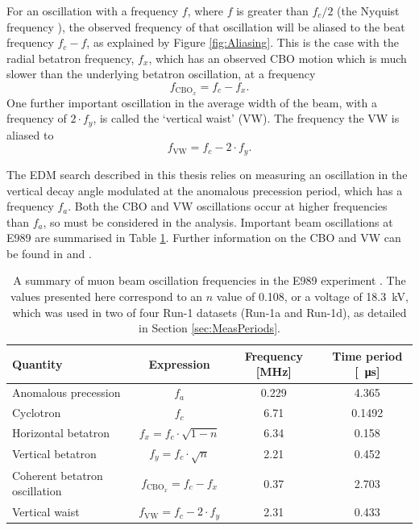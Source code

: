 For an oscillation with a frequency $f$, where $f$ is greater than $f_{c}/2$ (the Nyquist frequency \cite{Nyquist}), the observed frequency of that oscillation will be aliased to the beat frequency $f_{c} - f$, as explained by Figure \ref{fig:Aliasing}. This is the case with the radial betatron frequency, $f_{x}$, which has an observed CBO motion which is much slower than the underlying betatron oscillation, at a frequency 
%
\begin{equation}
  f_{\text{CBO}_{x}} = f_{c}-f_{x}.
  \label{eqn:CBOx}
\end{equation}
%
One further important oscillation in the average width of the beam, with a frequency of $2\cdot f_{y}$, is called the `vertical waist' (VW). The frequency the VW is aliased to 
%
\begin{equation}
  f_{\text{VW}} = f_{c}-2\cdot f_{y}.
  \label{eqn:VQ}
\end{equation}

The EDM search described in this thesis relies on measuring an oscillation in the vertical decay angle modulated at the anomalous precession period, which has a frequency $f_{a}$. Both the CBO and VW oscillations occur at higher frequencies than $f_{a}$, so must be considered in the analysis. Important beam oscillations at E989 are summarised in Table \ref{tbl:Frequencies}. Further information on the CBO and VW can be found in \cite{BeamDynamics} and \cite{KimCBO}.

\begin{table}[t!]
\centering
\begin{tabular}{l|ccc}
\hline
\hline
Quantity & Expression & Frequency [MHz] & Time period [\SI{}{\micro\second}] \\
\hline
Anomalous precession & $f_{a}$ & 0.229 & 4.365 \\
Cyclotron & $f_{c}$ & 6.71 & 0.1492 \\
Horizontal betatron & $f_{x}=f_{c}\cdot\sqrt{1-n}$ & 6.34 & 0.158 \\
Vertical betatron & $f_{y}=f_{c}\cdot\sqrt{n}$ & 2.21 & 0.452 \\
Coherent betatron oscillation & $f_{\text{CBO}_{x}} = f_{c}-f_{x}$ & 0.37 & 2.703 \\ 
Vertical waist & $f_{\text{VW}} = f_{c}-2\cdot f_{y}$ & 2.31 & 0.433 \\
\hline
\hline
\end{tabular}
\caption{A summary of muon beam oscillation frequencies in the E989 experiment \cite{TDR}. The values presented here correspond to an $n$ value of 0.108, or a voltage of \SI{18.3}{\kilo\volt}, which was used in two of four Run-1 datasets (Run-1a and Run-1d), as detailed in Section \ref{sec:MeasPeriods}.} 
\label{tbl:Frequencies}
\end{table}%

